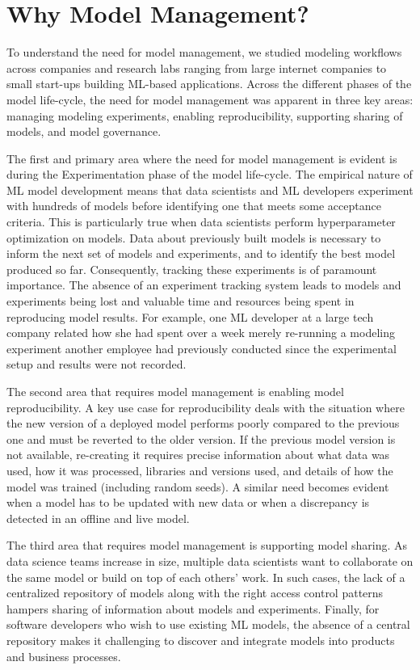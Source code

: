 \documentclass[11pt]{article}
\newcommand{\dss}{data scientists\xspace}
\newcommand{\mldevs}{ML developers\xspace}
\newcommand{\mldev}{ML developer\xspace}
\begin{document}
\section{Why Model Management?}
\label{sec:motivation}

To understand the need for model management, we studied modeling workflows across companies and research labs ranging from large internet companies to small start-ups building ML-based applications.
Across the different phases of the model life-cycle, the need for model management was apparent in three key areas: managing modeling experiments, enabling reproducibility, supporting sharing of models, and model governance.

The first and primary area where the need for model management is evident is during the Experimentation phase of the model life-cycle.
The empirical nature of ML model development means that \dss and \mldevs experiment with hundreds of models before identifying one that meets some acceptance criteria.
This is particularly true when \dss perform hyperparameter optimization on models.
Data about previously built models is necessary to inform the next set of models and experiments, and to identify the best model produced so far.
Consequently, tracking these experiments is of paramount importance.
The absence of an experiment tracking system leads to models and experiments being lost and valuable time and resources being spent in reproducing model results.
For example, one \mldev at a large tech company related how she had spent over a week merely re-running a modeling experiment another employee had previously conducted since the experimental setup and results were not recorded.

The second area that requires model management is enabling model reproducibility.
A key use case for reproducibility deals with the situation where the new version of a deployed model performs poorly compared to the previous one and must be reverted to the older version.
If the previous model version is not available, re-creating it requires precise information about what data was used, how it was processed, libraries and versions used, and details of how the model was trained (including random seeds).
A similar need becomes evident when a model has to be updated with new data or when a discrepancy is detected in an offline and live model.

The third area that requires model management is supporting model sharing.
As data science teams increase in size, multiple \dss want to collaborate on the same model or build on top of each others' work.
In such cases, the lack of a centralized repository of models along with the right access control patterns hampers sharing of information about models and experiments.
Finally, for software developers who wish to use existing ML models, the absence of a central repository makes it challenging to discover and integrate models into products and business processes.
    
\end{document}
